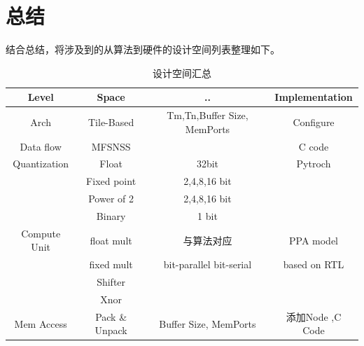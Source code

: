 \documentclass[UTF8]{scrartcl}
\begin{document}
  \section{总结}
  结合总结，将涉及到的从算法到硬件的设计空间列表整理如下。
   \begin{table}[h]
	   	\centering
	   	\caption{设计空间汇总}
	   	\begin{tabular*}{16cm}{c |c| c |c }
	   		\hline
		   		Level & Space & ..  & Implementation\\
		   	\hline
			   	Arch  & Tile-Based & Tm,Tn,Buffer Size, MemPorts &  Configure\\
		   	\hline
			   	Data flow & MFSNSS &  &C code\\
		   	\hline
			   	Quantization & Float & 32bit & Pytroch\\
			   	& Fixed point & 2,4,8,16 bit&\\
			   	& Power of 2 & 2,4,8,16 bit&\\
			   	& Binary & 1 bit&\\
		   	\hline
			   	Compute Unit & float mult &与算法对应& PPA model \\
				& fixed mult & bit-parallel bit-serial & based on RTL\\
				& Shifter &&\\
				& Xnor &&\\
			 \hline
				 Mem Access & Pack \& Unpack &Buffer Size, MemPorts&添加Node ,C Code\\
			\hline
		   	
		   			   	
	   	\end{tabular*}
   \end{table}





\end{document}
